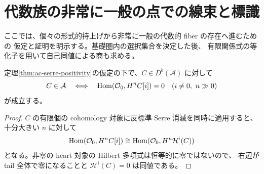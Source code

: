 \section{代数族の非常に一般の点での線束と標識}\label{sec:generic-lines}

ここでは、個々の形式的持上げから非常に一般の代数的 fiber の存在へ進むための
仮定と証明を明示する。基礎圏内の選択集合を決定した後、
有限関係式の等化子を用いて自己同値による商も求める。

\begin{lemma}\label{lem:ac-heart-detection}
定理\ref{thm:ac-serre-positivity}の仮定の下で、$C\in D^b(\mathcal A)$ に対して
\[
 C\in\mathcal A\quad\Longleftrightarrow\quad
 \operatorname{Hom}(\mathcal O_0,H^nC[i])=0\quad(i\ne0,\ n\gg0)
\]
が成立する。
\end{lemma}
\begin{proof}
$C$ の有限個の cohomology 対象に反標準 Serre 消滅を同時に適用すると、
十分大きい $n$ に対して
\[
 \operatorname{Hom}(\mathcal O_0,H^nC[i])\cong
 \operatorname{Hom}(\mathcal O_0,H^n\mathcal H^i(C))
\]
となる。非零の heart 対象の Hilbert 多項式は恒等的に零ではないので、
右辺が tail 全体で零になることと $\mathcal H^i(C)=0$ は同値である。
\end{proof}

